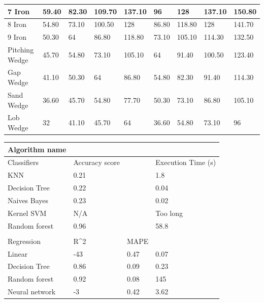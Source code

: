 \documentclass[11pt,landscape]{article}
\begin{document}
\begin{table}
\begin{tabular}{|l|l|l|l|l|l|l|l|l|}
    7 Iron         & 59.40    & 82.30   & 109.70 & 137.10    & 96       & 128     & 137.10 & 150.80    \\ \hline
    8 Iron         & 54.80    & 73.10   & 100.50 & 128       & 86.80    & 118.80  & 128    & 141.70    \\ \hline
    9 Iron         & 50.30    & 64      & 86.80  & 118.80    & 73.10    & 105.10  & 114.30 & 132.50    \\ \hline
    Pitching Wedge & 45.70    & 54.80   & 73.10  & 105.10    & 64       & 91.40   & 100.50 & 123.40    \\ \hline
    Gap Wedge      & 41.10    & 50.30   & 64     & 86.80     & 54.80    & 82.30   & 91.40  & 114.30    \\ \hline
    Sand Wedge     & 36.60    & 45.70   & 54.80  & 77.70     & 50.30    & 73.10   & 86.80  & 105.10    \\ \hline
    Lob Wedge      & 32       & 41.10   & 45.70  & 64        & 36.60    & 54.80   & 73.10  & 96        \\ \hline
    \end{tabular}%
    \label{tab:guillermo_t1}
\end{table}
    
\begin{table}
    \centering
    \begin{tabular}{|l|l|l|l|}
        \hline
    Algorithm name &                &      &                     \\ \hline
    Classifiers    & Accuracy score &      & Execution Time (s)  \\ \hline
    KNN            & 0.21           &      & 1.8                 \\ \hline
    Decision Tree  & 0.22           &      & 0.04                \\ \hline
    Naives Bayes   & 0.23           &      & 0.02                \\ \hline
    Kernel SVM     & N/A            &      & Too long            \\ \hline
    Random forest  & 0.96           &      & 58.8                \\ \hline
                   &                &      &                     \\ \hline
    Regression     & R\^{}2         & MAPE &                     \\ \hline
    Linear         & -43            & 0.47 & 0.07                \\ \hline
    Decision Tree  & 0.86           & 0.09 & 0.23                \\ \hline
    Random forest  & 0.92           & 0.08 & 145                 \\ \hline
    Neural network & -3             & 0.42 & 3.62                \\  \hline
    \end{tabular}
    \label{tab:guillermo_t2}
\end{table}
    
\end{document}
